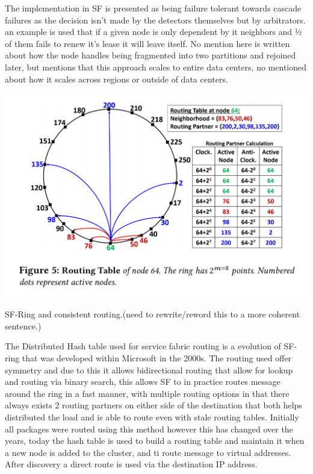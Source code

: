 \documentclass[a4paper,10pt,titlepage]{report}
\begin{document}
The implementation in SF is presented as being failure tolerant towards cascade failures as the decision isn't made by the detectors themselves but by arbitrators. an example is used that if a given node is only dependent by it neighbors and ½ of them fails to renew it's lease it will leave itself. No mention here is written about how the node handles being fragmented into two partitions and rejoined later, but mentions that this approach scales to entire data centers, no mentioned about how it scales across regions or outside of data centers.\\
\vspace{5mm}

\includegraphics[scale=0.3]{images/servicefabric-fig-ring-topology.jpeg}

SF-Ring and consistent routing.(need to rewrite/reword this to a more coherent sentence.)

The Distributed Hash table used for service fabric routing is a evolution of SF-ring that was developed within Microsoft in the 2000s. The routing used offer symmetry and due to this it allows bidirectional routing that allow for lookup and routing via binary search, this allows SF to in practice routes message around the ring in a fast manner, with multiple routing options in that there always exists 2 routing partners on either side of the destination that both helps distributed the load and is able to route even with stale routing tables. Initially all packages were routed using this method however this has changed over the years, today the hash table is used to build a routing table and maintain it when a new node is added to the cluster, and ti route message to virtual addresses. After discovery a direct route is used via the destination IP address. \\
\vspace{5mm}
\end{document}
